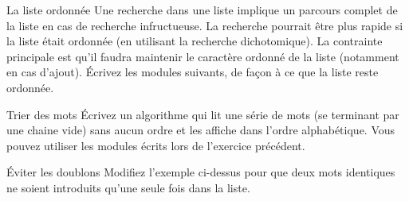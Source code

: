 	
\begin{Exercice}{La liste ordonnée}
		Une recherche dans une liste implique un parcours complet de la liste en
		cas de recherche infructueuse. La recherche pourrait être plus rapide
		si la liste était ordonnée (en utilisant la recherche dichotomique). La
		contrainte principale est qu'il faudra maintenir le
		caractère ordonné de la liste (notamment en cas
		d'ajout). Écrivez les modules suivants, de façon à ce
		que la liste reste ordonnée.


\end{Exercice}

\begin{Exercice}{Trier des mots}
		Écrivez un algorithme qui lit une série de mots (se terminant par une
		chaine vide) sans aucun ordre et les affiche dans l’ordre alphabétique.
		Vous pouvez utiliser les modules écrits lors de
		l'exercice précédent.
		
\end{Exercice}

\begin{Exercice}{Éviter les doublons}
		Modifiez l’exemple ci-dessus pour que deux mots identiques ne soient
		introduits qu’une seule fois dans la liste.
\end{Exercice}

